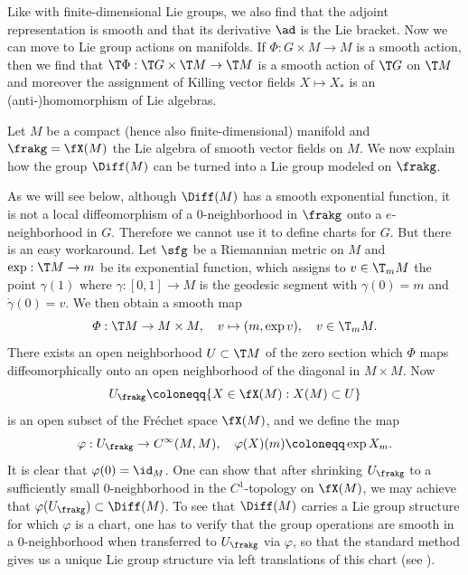 Like with finite-dimensional Lie groups, we also find that the adjoint representation is smooth and that its derivative $\ad$ is the Lie bracket. Now we can move to Lie group actions on manifolds. If $\Phi:G\times M\to M$ is a smooth action, then we find that  $\T\Phi:\T G\times \T M\to \T M$ is a smooth action of $\T G$ on $\T M$ and moreover the assignment of Killing vector fields $X\mapsto X_\ast$ is an (anti-)homomorphism of Lie algebras.

\begin{example}
    Let $M$ be a compact (hence also finite-dimensional) manifold and $\frakg=\fX(M)$ the Lie algebra of smooth vector fields on $M$. We now explain how the group $\Diff(M)$ can be turned into a Lie group modeled on $\frakg$.

    
    As we will see below, although $\Diff(M)$ has a smooth exponential function, it is not a local diffeomorphism of a $0$-neighborhood in $\frakg$ onto a $e$-neighborhood in $G$. Therefore we cannot use it to define charts for $G$. But there is an easy workaround. Let $\sfg$ be a Riemannian metric on $M$ and $\exp:\T M\to m$ be its exponential function, which assigns to $v\in \T_mM$ the point $\gamma(1)$ where $\gamma:[0,1]\to M$ is the geodesic segment with $\gamma(0)=m$ and $\dot\gamma(0)=v$. We then obtain a smooth map
    \[\varPhi:\T M\to M\times M,\quad v\mapsto (m,\exp v), \quad v\in \T_mM.\]
    There exists an open neighborhood $U\subset \T M$ of the zero section which $\varPhi$ maps diffeomorphically onto an open neighborhood of the diagonal in $M\times M$. Now
    \[U_\frakg\coloneqq \{X\in \fX(M):X(M)\subset U\}\]
    is an open subset of the Fr\'echet space $\fX(M)$, and we define the map
    \[\varphi:U_\frakg\to C^\infty(M,M),\quad \varphi(X)(m)\coloneqq \exp X_m.\]
    It is clear that $\varphi(0)=\id_M$. One can show that after shrinking $U_\frakg$ to a sufficiently small $0$-neighborhood in the $C^1$-topology on $\fX(M)$, we may achieve that $\varphi(U_\frakg)\subset \Diff(M)$. To see that $\Diff(M)$ carries a Lie group structure for which $\varphi$ is a chart, one has to verify that the group operations are smooth in a $0$-neighborhood when transferred to $U_\frakg$ via $\varphi$, so that the standard method gives us a unique Lie group structure via left translations of this chart (see \cite[Thm.~9.4.4]{HN}). 
    

\end{example}

